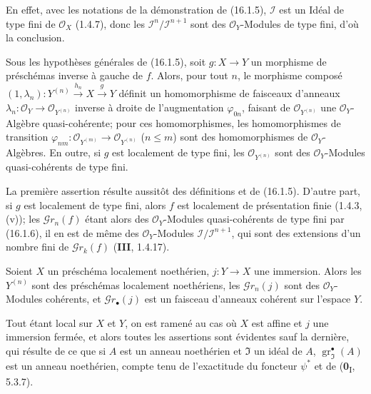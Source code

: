 En effet, avec les notations de la démonstration de (16.1.5), $\mathscr{I}$ est un
Idéal de type fini de $\mathcal{O}_X$ (1.4.7), donc les
$\mathscr{I}^n/\mathscr{I}^{n+1}$ sont des $\mathcal{O}_Y$-Modules de type fini,
d'où la conclusion.

\begin{corollary}[16.1.7]
\label{IV.16.1.7}
Sous les hypothèses générales de \textup{(16.1.5)}, soit $g:X\to Y$ un morphisme de
préschémas inverse à gauche de $f$. Alors, pour tout $n$, le morphisme composé
$(1,\lambda_n):Y^{(n)}\xrightarrow{h_n}X\xrightarrow{g}Y$ définit un
homomorphisme de faisceaux d'anneaux
$\lambda_n:\mathcal{O}_Y\to\mathcal{O}_{Y^{(n)}}$ inverse à droite de
l'augmentation $\varphi_{0n}$, faisant de $\mathcal{O}_{Y^{(n)}}$ une
$\mathcal{O}_Y$-Algèbre quasi-cohérente; pour ces homomorphismes, les
homomorphismes de transition
$\varphi_{nm}:\mathcal{O}_{Y^{(m)}}\to\mathcal{O}_{Y^{(n)}}$ \textup{($n\leq m$)} sont
des homomorphismes de $\mathcal{O}_Y$-Algèbres. En outre, si $g$ est localement
de type fini, les $\mathcal{O}_{Y^{(n)}}$ sont des $\mathcal{O}_Y$-Modules
quasi-cohérents de type fini.
\end{corollary}

La première assertion résulte aussitôt des définitions et de (16.1.5). D'autre
part, si $g$ est localement de type fini, alors $f$ est localement de
présentation finie (1.4.3, (v)); les $\mathscr{G}r_n(f)$ étant alors des
$\mathcal{O}_Y$-Modules quasi-cohérents de type fini par (16.1.6), il en est de
même des $\mathcal{O}_Y$-Modules
$\mathscr{I}/\mathscr{I}^{n+1}$, qui sont des extensions d'un nombre fini de
$\mathscr{G}r_k(f)$ (\textbf{III}, 1.4.17).

\begin{proposition}[16.1.8]
\label{IV.16.1.8}
Soient $X$ un préschéma localement noethérien, $j:Y\to X$ une immersion. Alors
les $Y^{(n)}$ sont des préschémas localement noethériens, les
$\mathscr{G}r_n(j)$ sont des $\mathcal{O}_Y$-Modules cohérents, et
$\mathscr{G}r_\bullet(j)$ est un faisceau d'anneaux cohérent sur l'espace $Y$.
\end{proposition}

Tout étant local sur $X$ et $Y$, on est ramené au cas où $X$ est affine et $j$
une immersion fermée, et alors toutes les assertions sont évidentes sauf la
dernière, qui résulte de ce que si $A$ est un anneau noethérien et
$\mathfrak{I}$ un idéal de $A$, $\operatorname{gr}_{\mathfrak{I}}^\bullet(A)$
est un anneau noethérien, compte tenu de l'exactitude du foncteur $\psi^*$ et de
(\textbf{0}\textsubscript{I}, 5.3.7).

